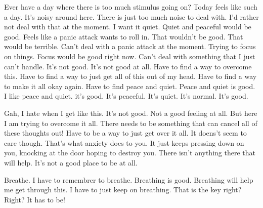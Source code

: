 Ever have a day where there is too much stimulus going on? Today feels like such
a day. It's noisy around here. There is just too much noise to deal with. I'd
rather not deal with that at the moment. I want it quiet. Quiet and peaceful
would be good. Feels like a panic attack wants to roll in. That wouldn't be
good. That would be terrible. Can't deal with a panic attack at the moment.
Trying to focus on things. Focus would be good right now. Can't deal with
something that I just can't handle. It's not good. It's not good at all. Have to
find a way to overcome this. Have to find a way to just get all of this out of
my head. Have to find a way to make it all okay again. Have to find peace and
quiet. Peace and quiet is good. I like peace and quiet. it's good. It's
peaceful. It's quiet. It's normal. It's good.

Gah, I hate when I get like this. It's not good. Not a good feeling at all. But
here I am trying to overcome it all. There needs to be something that can cancel
all of these thoughts out! Have to be a way to just get over it all. It doens't
seem to care though. That's what anxiety does to you. It just keeps pressing
down on you, knocking at the door hoping to destroy you. There isn't anything
there that will help. It's not a good place to be at all.

Breathe. I have to remembrer to breathe. Breathing is good. Breathing will help
me get through this. I have to just keep on breathing. That is the key right?
Right? It has to be!